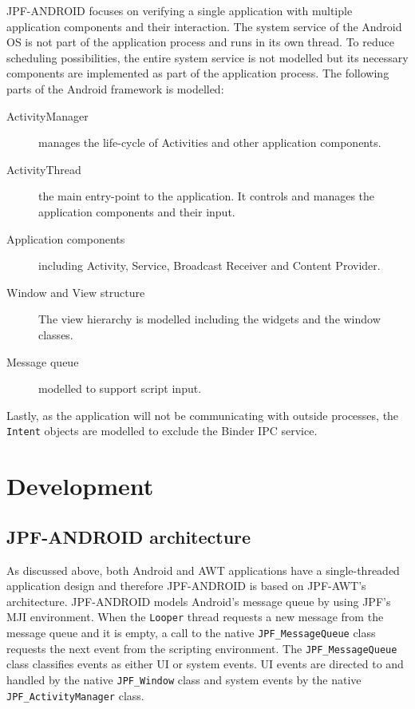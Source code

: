 \documentclass{acm_proc_article-sp}
\begin{document}
JPF-ANDROID focuses on verifying a single application with multiple application components and their interaction. The system service of
the Android OS is not part of the application process and runs in its own thread. To reduce scheduling possibilities, the entire system
service is not modelled but its necessary components are implemented as part of the application process. The following parts of the Android
framework is modelled:
\vspace{-10pt}
\begin{description}
 \item [ActivityManager]  manages the life-cycle of Activities and other application components.
 \item [ActivityThread]   the main entry-point to the application. It controls and manages the application components and their input.
 \item [Application components] including Activity, Service, Broadcast Receiver and Content Provider. 
 \item [Window and View structure] The view hierarchy is modelled including the widgets and the window classes.
 \item [Message queue] modelled to support script input.
\end{description}
\vspace{-5pt}
Lastly, as the application will not be communicating with outside processes, the \texttt{Intent} objects are modelled to exclude the
Binder IPC service.

\section{Development}
\subsection{JPF-ANDROID architecture}
As discussed above, both Android and AWT applications have a single-threaded application design and therefore JPF-ANDROID is based on JPF-AWT's architecture.
\linebreak JPF-ANDROID models Android's message queue by using JPF's MJI
environment. When the \texttt{Looper} thread requests a new message from the message queue and it is empty, a call to the native
\texttt{JPF\_MessageQueue} class requests the next event from the scripting environment. The \texttt{JPF\_MessageQueue} class classifies
events as either UI or system events. UI events are directed to and handled by the native \texttt{JPF\_Window} class and system events by
the native \texttt{JPF\_ActivityManager} class.
\end{document}

